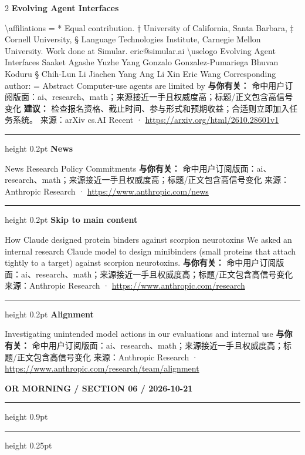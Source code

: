 \documentclass[10.5pt]{ctexart}
\begin{document}
\begin{multicols}{2}
{\large\bfseries Evolving Agent Interfaces}\par
\textbackslash{}affiliations = * Equal contribution. † University of California, Santa Barbara, ‡ Cornell University, § Language Technologies Institute, Carnegie Mellon University. Work done at Simular. eric@simular.ai \textbackslash{}uselogo Evolving Agent Interfaces Saaket Agashe Yuzhe Yang Gonzalo Gonzalez-Pumariega Bhuvan Koduru § Chih-Lun Li Jiachen Yang Ang Li Xin Eric Wang Corresponding author: = Abstract Computer-use agents are limited by
\textbf{与你有关：} 命中用户订阅版面：ai、research、math；来源接近一手且权威度高；标题/正文包含高信号变化
\textbf{建议：} 检查报名资格、截止时间、参与形式和预期收益；合适则立即加入任务系统。
{\footnotesize\color{ormuted} 来源：arXiv cs.AI Recent · \url{https://arxiv.org/html/2610.28601v1}}
\vspace{2mm}
\hrule height 0.2pt
\vspace{2mm}
{\large\bfseries News}\par
News Research Policy Commitments
\textbf{与你有关：} 命中用户订阅版面：ai、research、math；来源接近一手且权威度高；标题/正文包含高信号变化
{\footnotesize\color{ormuted} 来源：Anthropic Research · \url{https://www.anthropic.com/news}}
\vspace{2mm}
\hrule height 0.2pt
\vspace{2mm}
{\large\bfseries Skip to main content}\par
How Claude designed protein binders against scorpion neurotoxins We asked an internal research Claude model to design minibinders (small proteins that attach tightly to a target) against scorpion neurotoxins.
\textbf{与你有关：} 命中用户订阅版面：ai、research、math；来源接近一手且权威度高；标题/正文包含高信号变化
{\footnotesize\color{ormuted} 来源：Anthropic Research · \url{https://www.anthropic.com/research}}
\vspace{2mm}
\hrule height 0.2pt
\vspace{2mm}
{\large\bfseries Alignment}\par
Investigating unintended model actions in our evaluations and internal use
\textbf{与你有关：} 命中用户订阅版面：ai、research、math；来源接近一手且权威度高；标题/正文包含高信号变化
{\footnotesize\color{ormuted} 来源：Anthropic Research · \url{https://www.anthropic.com/research/team/alignment}}
\end{multicols}
\newpage
{\small\bfseries OR MORNING / SECTION 06 / 2026-10-21}
\vspace{2mm}
\hrule height 0.9pt
\vspace{1.5mm}
\hrule height 0.25pt
\vspace{4mm}
\end{document}
